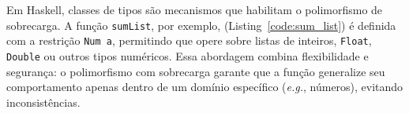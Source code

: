 Em Haskell, classes de tipos são mecanismos que habilitam o polimorfismo de sobrecarga. 
A função \texttt{sumList}, por exemplo, (Listing~\ref{code:sum_list}) é definida com a restrição \texttt{Num a}, permitindo que opere sobre listas de inteiros, \texttt{Float}, \texttt{Double} ou outros tipos numéricos. 
Essa abordagem combina flexibilidade e segurança: o polimorfismo com sobrecarga garante que a função generalize seu comportamento apenas dentro de um domínio específico (\textit{e.g.}, números), evitando inconsistências. 


